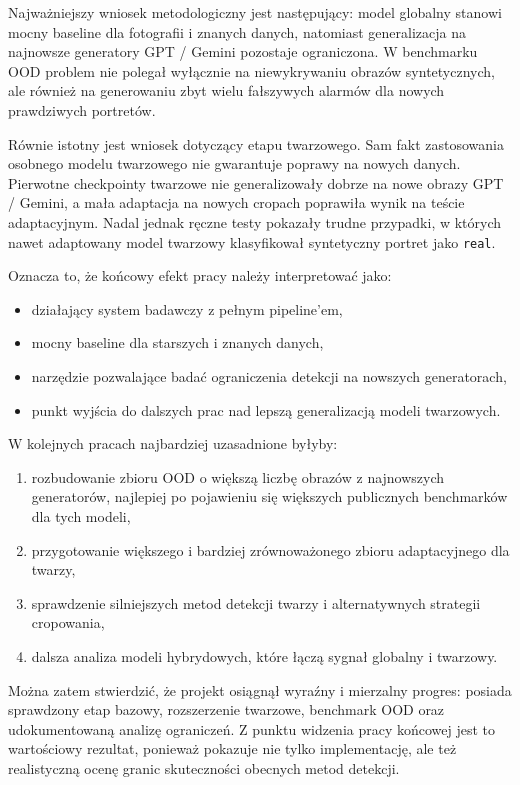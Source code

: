 Najważniejszy wniosek metodologiczny jest następujący: model globalny stanowi mocny baseline dla fotografii i znanych danych, natomiast generalizacja na najnowsze generatory GPT / Gemini pozostaje ograniczona. W benchmarku OOD problem nie polegał wyłącznie na niewykrywaniu obrazów syntetycznych, ale również na generowaniu zbyt wielu fałszywych alarmów dla nowych prawdziwych portretów.

Równie istotny jest wniosek dotyczący etapu twarzowego. Sam fakt zastosowania osobnego modelu twarzowego nie gwarantuje poprawy na nowych danych. Pierwotne checkpointy twarzowe nie generalizowały dobrze na nowe obrazy GPT / Gemini, a mała adaptacja na nowych cropach poprawiła wynik na teście adaptacyjnym. Nadal jednak ręczne testy pokazały trudne przypadki, w których nawet adaptowany model twarzowy klasyfikował syntetyczny portret jako \texttt{real}.

Oznacza to, że końcowy efekt pracy należy interpretować jako:

\begin{itemize}
    \item działający system badawczy z pełnym pipeline'em,
    \item mocny baseline dla starszych i znanych danych,
    \item narzędzie pozwalające badać ograniczenia detekcji na nowszych generatorach,
    \item punkt wyjścia do dalszych prac nad lepszą generalizacją modeli twarzowych.
\end{itemize}

W kolejnych pracach najbardziej uzasadnione byłyby:

\begin{enumerate}
    \item rozbudowanie zbioru OOD o większą liczbę obrazów z najnowszych generatorów, najlepiej po pojawieniu się większych publicznych benchmarków dla tych modeli,
    \item przygotowanie większego i bardziej zrównoważonego zbioru adaptacyjnego dla twarzy,
    \item sprawdzenie silniejszych metod detekcji twarzy i alternatywnych strategii cropowania,
    \item dalsza analiza modeli hybrydowych, które łączą sygnał globalny i twarzowy.
\end{enumerate}

Można zatem stwierdzić, że projekt osiągnął wyraźny i mierzalny progres: posiada sprawdzony etap bazowy, rozszerzenie twarzowe, benchmark OOD oraz udokumentowaną analizę ograniczeń. Z punktu widzenia pracy końcowej jest to wartościowy rezultat, ponieważ pokazuje nie tylko implementację, ale też realistyczną ocenę granic skuteczności obecnych metod detekcji.
